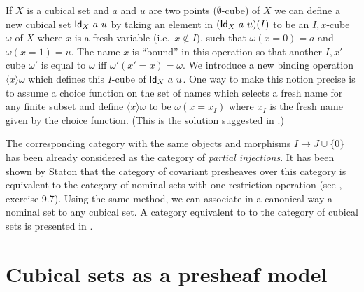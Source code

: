 \documentclass[a4paper,USenglish,draft]{lipics}
\newcommand{\Id}{{\sf Id}}
\newcommand{\set}[1]{\{#1\}}
\newcommand{\es}{\emptyset}
\newcommand{\bind}[2]{{\langle}#1{\rangle}#2}
\begin{document}
If $X$ is a cubical set and $a$ and $u$ are two points ($\es$-cube) of
$X$ we can define a new cubical set $\Id_X~a~u$ by taking an element
in $(\Id_X~a~u)(I)$ to be an $I,x$-cube $\omega$ of $X$ where $x$ is a
fresh variable (i.e.\ $x \notin I$), such that $\omega(x=0) = a$ and
$\omega(x=1) = u$. The name $x$ is ``bound'' in this operation so that
another $I,x'$-cube $\omega'$ is equal to $\omega$ if{f}
$\omega'(x'=x) = \omega$.
We introduce a new binding operation $\bind{x}{\omega}$ which defines
this $I$-cube of $\Id_X~a~u$.  One way to make this notion precise is
to assume a choice function on the set of names which selects a fresh
name for any finite subset and define $\bind{x}{\omega}$ to be $\omega
(x=x_I)$ where $x_I$ is the fresh name given by the choice
function. (This is the solution suggested in \cite{Stoughton}.)

\medskip

The corresponding category with the same objects and morphisms $I \to
J\cup\{0\}$ has been already considered as the category of {\em
  partial injections}. It has been shown by Staton that the category
of covariant presheaves over this category is equivalent to the
category of nominal sets with one restriction operation (see
\cite{pitts}, exercise 9.7). Using the same method, we can associate
in a canonical way a nominal set to any cubical set. A category
equivalent to to the category of cubical sets is presented in
\cite{Pitts}.

\section{Cubical sets as a presheaf model}
\label{sec:presheaf-models}
\end{document}

